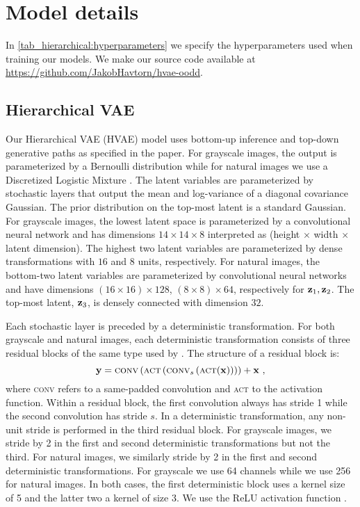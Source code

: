 {\section{Model details}\label{sec_hierarchical:model-details}
In \cref{tab_hierarchical:hyperparameters} we specify the hyperparameters used when training our models.
We make our source code available at \url{https://github.com/JakobHavtorn/hvae-oodd}.

\subsection{Hierarchical VAE}
Our Hierarchical VAE (HVAE) model uses bottom-up inference and top-down generative paths as specified in the paper.
For grayscale images, the output is parameterized by a Bernoulli distribution while for natural images we use a Discretized Logistic Mixture \parencite{salimans_pixelcnn_2017}.
The latent variables are parameterized by stochastic layers that output the mean and log-variance of a diagonal covariance Gaussian. The prior distribution on the top-most latent is a standard Gaussian.
For grayscale images, the lowest latent space is parameterized by a convolutional neural network and has dimensions $14\times14\times8$ interpreted as (height $\times$ width $\times$ latent dimension). The highest two latent variables are parameterized by dense transformations with $16$ and $8$ units, respectively.
For natural images, the bottom-two latent variables are parameterized by convolutional neural networks and have dimensions $(16\times16)\times128$, $(8\times8)\times64$, respectively for ${\mathbf{z}}_1, {\mathbf{z}}_2$. The top-most latent, ${\mathbf{z}}_3$, is densely connected with dimension $32$.

Each stochastic layer is preceded by a deterministic transformation.
For both grayscale and natural images, each deterministic transformation consists of three residual blocks of the same type used by \textcite{maaloe_biva_2019}. The structure of a residual block is:
\begin{equation}
    {\mathbf{y}} = \textsc{conv}\left( \textsc{act} \left( \textsc{conv}_s \left( \textsc{act}({\mathbf{x}}) \right) \right) \right) + {\mathbf{x}} \ ,
\end{equation}
where \textsc{conv} refers to a same-padded convolution and \textsc{act} to the activation function. Within a residual block, the first convolution always has stride 1 while the second convolution has stride $s$. In a deterministic transformation, any non-unit stride is performed in the third residual block. For grayscale images, we stride by 2 in the first and second deterministic transformations but not the third. For natural images, we similarly stride by 2 in the first and second deterministic transformations. For grayscale we use 64 channels while we use 256 for natural images.
In both cases, the first deterministic block uses a kernel size of 5 and the latter two a kernel of size 3. We use the ReLU activation function \parencite{fukushima_neocognitron_1980, nair_rectified_2010}.

}
